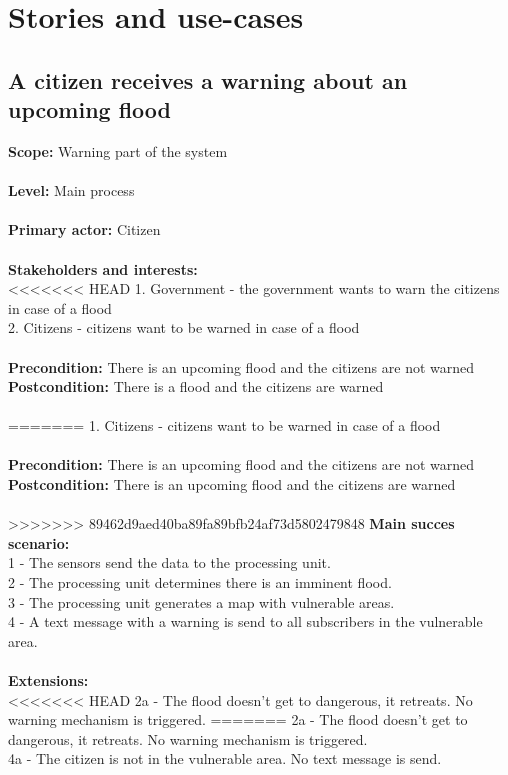 \section{Stories and use-cases}
\subsection{A citizen receives a warning about an upcoming flood}
\textbf{Scope:} Warning part of the system\\\\
\textbf{Level:} Main process\\\\
\textbf{Primary actor:} Citizen\\\\
\textbf{Stakeholders and interests:}\\
<<<<<<< HEAD
	1. Government - the government wants to warn the citizens in case of a flood \\
	2. Citizens - citizens want to be warned in case of a flood \\\\
\textbf{Precondition:} There is an upcoming flood and the citizens are not warned\\
\textbf{Postcondition:} There is a flood and the citizens are warned\\\\
=======
	1. Citizens - citizens want to be warned in case of a flood \\\\
\textbf{Precondition:} There is an upcoming flood and the citizens are not warned\\
\textbf{Postcondition:} There is an upcoming flood and the citizens are warned\\\\
>>>>>>> 89462d9aed40ba89fa89bfb24af73d5802479848
\textbf{Main succes scenario:} \\
1 - The sensors send the data to the processing unit.\\
2 - The processing unit determines there is an imminent flood.\\
3 - The processing unit generates a map with vulnerable areas.\\
4 - A text message with a warning is send to all subscribers in the vulnerable area.\\\\
\textbf{Extensions:} \\
<<<<<<< HEAD
2a - The flood doesn't get to dangerous, it retreats. No warning mechanism is triggered.
=======
2a - The flood doesn't get to dangerous, it retreats. No warning mechanism is triggered.\\
4a - The citizen is not in the vulnerable area. No text message is send.

